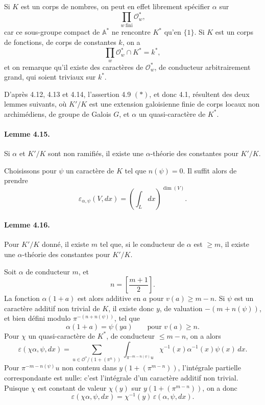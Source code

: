 \documentclass[10pt]{article}
\begin{document}
Si \(K\) est un corps de nombres, on peut en effet librement spécifier \(\alpha\) sur
\[
\prod_{w\ \mathrm{fini}}\mathcal O_w^*,
\]
car ce sous-groupe compact de \(\mathbb A^*\) ne rencontre \(K^*\) qu'en \(\{1\}\). Si \(K\) est un corps de fonctions, de corps de constantes \(k\), on a
\[
\prod_w\mathcal O_w^*\cap K^*=k^*,
\]
et on remarque qu'il existe des caractères de \(\mathcal O_w^*\), de conducteur arbitrairement grand, qui soient triviaux sur \(k^*\).

D'après 4.12, 4.13 et 4.14, l'assertion 4.9 \((*)\), et donc 4.1, résultent des deux lemmes suivants, où \(K'/K\) est une extension galoisienne finie de corps locaux non archimédiens, de groupe de Galois \(G\), et \(\alpha\) un quasi-caractère de \(K^*\).

\paragraph{Lemme 4.15.} Si \(\alpha\) et \(K'/K\) sont non ramifiés, il existe une \(\alpha\)-théorie des constantes pour \(K'/K\).

Choisissons pour \(\psi\) un caractère de \(K\) tel que \(n(\psi)=0\). Il suffit alors de prendre
\[
\varepsilon_{\alpha,\psi}(V,dx)=
\left(\int_L dx\right)^{\dim(V)}.
\]

\paragraph{Lemme 4.16.} Pour \(K'/K\) donné, il existe \(m\) tel que, si le conducteur de \(\alpha\) est \(\ge m\), il existe une \(\alpha\)-théorie des constantes pour \(K'/K\).

Soit \(\alpha\) de conducteur \(m\), et
\[
n=\left[\frac{m+1}{2}\right].
\]
La fonction \(\alpha(1+a)\) est alors additive en \(a\) pour \(v(a)\ge m-n\). Si \(\psi\) est un caractère additif non trivial de \(K\), il existe donc \(y\), de valuation \(-(m+n(\psi))\), et bien défini modulo \(\pi^{-(n+n(\psi))}\), tel que
\[
\alpha(1+a)=\psi(ya)\qquad\text{pour }v(a)\ge n.
\]
Pour \(\chi\) un quasi-caractère de \(K^*\), de conducteur \(\le m-n\), on a alors
\[
\tag{4.16.1}
\varepsilon(\chi\alpha,\psi,dx)
=
\sum_{u\in\mathcal O^*/(1+(\pi^n))}
\int_{\pi^{-m-n(\psi)}u}
\chi^{-1}(x)\alpha^{-1}(x)\psi(x)\,dx.
\]
Pour \(\pi^{-m-n(\psi)}u\) non contenu dans \(y(1+(\pi^{m-n}))\), l'intégrale partielle correspondante est nulle: c'est l'intégrale d'un caractère additif non trivial. Puisque \(\chi\) est constant de valeur \(\chi(y)\) sur \(y(1+(\pi^{m-n}))\), on a donc
\[
\varepsilon(\chi\alpha,\psi,dx)
=
\chi^{-1}(y)\,\varepsilon(\alpha,\psi,dx).
\]
\end{document}
